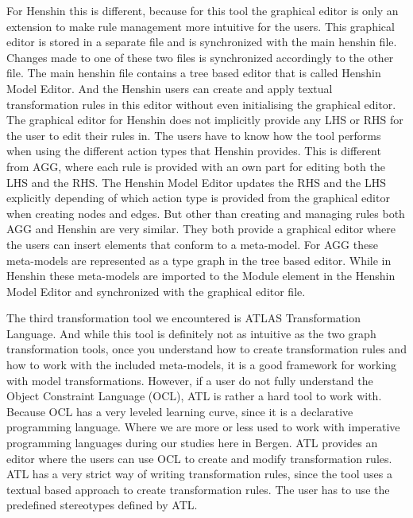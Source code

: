 For Henshin this is different, because for this tool the graphical editor
is only an extension to make rule management more intuitive for the users. This
graphical editor is stored in a separate file and is synchronized with the main
henshin file. Changes made to one of these two files is synchronized
accordingly to the other file. The main henshin file contains a tree based
editor that is called Henshin Model Editor. And the Henshin users can create and
apply textual transformation rules in this editor without even initialising the
graphical editor. The graphical editor for Henshin does not implicitly provide
any LHS or RHS for the user to edit their rules in. The users have to know how the tool
performs when using the different action types that Henshin provides. This is
different from AGG, where each rule is provided with an own part for editing
both the LHS and the RHS. The Henshin Model Editor updates the RHS and the LHS
explicitly depending of which action type is provided from the graphical
editor when creating nodes and edges. But other than creating and managing
rules both AGG and Henshin are very similar. They both provide a graphical editor where
the users can insert elements that conform to a meta-model. For AGG these
meta-models are represented as a type graph in the tree based editor. While in
Henshin these meta-models are imported to the Module element in the Henshin Model
Editor and synchronized with the graphical editor file.

The third transformation tool we encountered is ATLAS Transformation Language.
And while this tool is definitely not as intuitive as the two graph
transformation tools, once you understand how to create transformation rules
and how to work with the included meta-models, it is a good framework for
working with model transformations. However, if a user do not fully understand
the Object Constraint Language (OCL), ATL is rather a hard tool to work with.
Because OCL has a very leveled learning curve, since it is a declarative
programming language. Where we are more or less used to work with imperative
programming languages during our studies here in Bergen. ATL provides an editor
where the users can use OCL to create and modify transformation rules. ATL has
a very strict way of writing transformation rules, since the tool uses a
textual based approach to create transformation rules. The user has to use the
predefined stereotypes defined by ATL.



